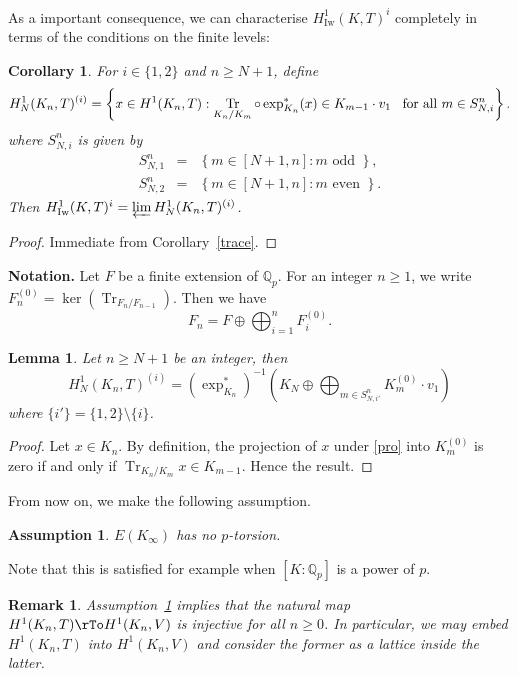 \documentclass{amsart}
\newcommand{\QQ}{\mathbb Q}
\DeclareMathOperator{\Tr}{Tr}
\DeclareMathOperator{\Iw}{Iw}
\newcommand{\Qp}{\QQ_p}
\newtheorem{lemma}[theorem]{Lemma}
\newtheorem{corollary}[theorem]{Corollary}
\newtheorem{remark}[theorem]{Remark}
\newtheorem{assumption}[theorem]{Assumption}
\begin{document}
  As a important consequence, we can characterise $H^1_{\Iw}(K,T)^i$ completely in terms of the conditions on the finite levels:
 
  \begin{corollary}\label{sameinv}
   For $i\in\{1,2\}$ and $n\geq N+1$, define
   \[ H_N^1(K_n,T)^{(i)}=\left\{x\in H^1(K_n,T):\Tr_{K_n\slash K_m}\circ\exp^*_{K_n}(x)\in K_{m-1}\cdot v_1\hspace{2ex}\text{for all $m\in S_{N,i}^n$}\right\}.\]
   where $S_{N,i}^n$ is given by
   \begin{eqnarray*}
    S_{N,1}^n&=&\left\{m\in[N+1,n]:m\text{ odd }\right\},\\
    S_{N,2}^n&=&\left\{m\in[N+1,n]:m\text{ even }\right\}.
   \end{eqnarray*}
   Then $H^1_{\Iw}(K,T)^i=\varprojlim H_N^1(K_n,T)^{(i)}$.
  \end{corollary}
  \begin{proof}
   Immediate from Corollary~\ref{trace}.
  \end{proof}
  

 {\bf Notation.} Let $F$ be a finite extension of $\Qp$. For an integer $n\ge1$, we write $F_n^{(0)}=\ker(\Tr_{F_n/F_{n-1}})$. Then we have
  \begin{equation}\label{pro}
  F_n=F\oplus\bigoplus_{i=1}^nF_i^{(0)}.
  \end{equation}

  \begin{lemma}\label{3des}
   Let $n\ge N+1$ be an integer, then
   \[
    H_N^1(K_n,T)^{(i)}=\left(\exp^*_{K_n}\right)^{-1}\left(K_N\oplus\bigoplus_{m\in S_{N,i'}^n}K_{m}^{(0)}\cdot v_1\right)
   \]
   where $\{i'\}=\{1,2\}\setminus\{i\}$.
  \end{lemma}
  \begin{proof}
   Let $x\in K_n$. By definition, the projection of $x$ under \eqref{pro} into $K_m^{(0)}$ is zero if and only if $\Tr_{K_n/K_{m}}x\in K_{m-1}$. Hence the result.
  \end{proof}
   
  From now on, we make the following assumption. 
  
  \begin{assumption}\label{assumptionptorsion}
   $E(K_\infty)$ has no $p$-torsion.
  \end{assumption}
 
  Note that this is satisfied for example when $[K:\Qp]$ is a power of $p$. 
  \begin{remark}
   Assumption~\ref{assumptionptorsion} implies that the natural map $H^1(K_n,T)\rTo H^1(K_n,V)$ is injective for all $n\ge0$. In particular, we may embed $H^1(K_n,T)$ into $H^1(K_n,V)$ and consider the former as a lattice inside the latter. 
  \end{remark}
\end{document}
